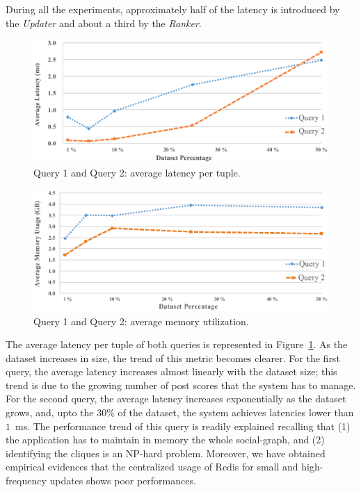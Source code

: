 During all the experiments, approximately half of the latency is introduced by the \textit{Updater} and about a third by the \textit{Ranker}.

\begin{figure}
	\centering
	\includegraphics[width=\columnwidth]{fig/latency}
	\caption{Query 1 and Query 2: average latency per tuple.}
	\label{fig:latency}
\end{figure}

\begin{figure}
	\centering
	\includegraphics[width=\columnwidth]{fig/memory}
	\caption{Query 1 and Query 2: average memory utilization.}
	\label{fig:memory}
\end{figure}

The average latency per tuple of both queries is represented in Figure~\ref{fig:latency}.
%
As the dataset increases in size, the trend of this metric becomes clearer.
%
For the first query, the average latency increases almost linearly with the dataset size; this trend is due to the growing number of post scores that the system has to manage.
%
For the second query, the average latency increases exponentially as the dataset grows, and, upto the $ 30 \% $ of the dataset, the system achieves latencies lower than $ 1 $~ms.
The performance trend of this query is readily explained recalling that (1) the application has to maintain in memory the whole social-graph, and (2) identifying the cliques is an NP-hard problem.
Moreover, we have obtained empirical evidences that the centralized usage of Redis for small and high-frequency updates shows poor performances.

